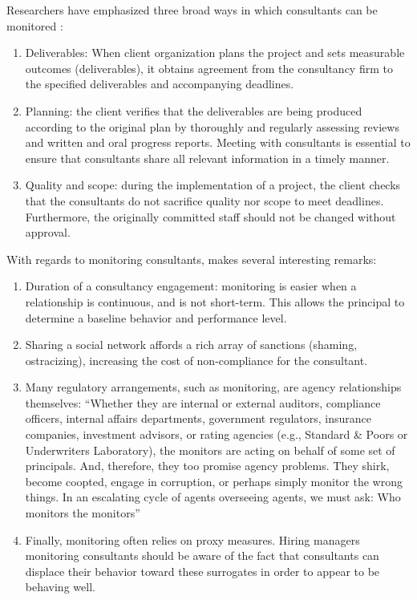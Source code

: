 \documentclass[12pt]{article}
\providecommand{\tightlist}{%
  \setlength{\itemsep}{0pt}\setlength{\parskip}{0pt}}
\begin{document}
Researchers have emphasized three broad ways in which consultants can be
monitored \citep[ 15]{basu2011}:

\begin{enumerate}
\def\labelenumi{\arabic{enumi}.}
\tightlist
\item
  Deliverables: When client organization plans the project and sets
  measurable outcomes (deliverables), it obtains agreement from the
  consultancy firm to the specified deliverables and accompanying
  deadlines.
\item
  Planning: the client verifies that the deliverables are being produced
  according to the original plan by thoroughly and regularly assessing
  reviews and written and oral progress reports. Meeting with
  consultants is essential to ensure that consultants share all relevant
  information in a timely manner.
\item
  Quality and scope: during the implementation of a project, the client
  checks that the consultants do not sacrifice quality nor scope to meet
  deadlines. Furthermore, the originally committed staff should not be
  changed without approval.
\end{enumerate}

With regards to monitoring consultants, \citet[275-280]{shapiro2005}
makes several interesting remarks:

\begin{enumerate}
\def\labelenumi{\arabic{enumi}.}
\tightlist
\item
  Duration of a consultancy engagement: monitoring is easier when a
  relationship is continuous, and is not short-term. This allows the
  principal to determine a baseline behavior and performance level.
\item
  Sharing a social network affords a rich array of sanctions (shaming,
  ostracizing), increasing the cost of non-compliance for the
  consultant.
\item
  Many regulatory arrangements, such as monitoring, are agency
  relationships themselves: ``Whether they are internal or external
  auditors, compliance officers, internal affairs departments,
  government regulators, insurance companies, investment advisors, or
  rating agencies (e.g., Standard \& Poors or Underwriters Laboratory),
  the monitors are acting on behalf of some set of principals. And,
  therefore, they too promise agency problems. They shirk, become
  coopted, engage in corruption, or perhaps simply monitor the wrong
  things. In an escalating cycle of agents overseeing agents, we must
  ask: Who monitors the monitors''
\item
  Finally, monitoring often relies on proxy measures. Hiring managers
  monitoring consultants should be aware of the fact that consultants
  can displace their behavior toward these surrogates in order to appear
  to be behaving well.
\end{enumerate}
\end{document}

